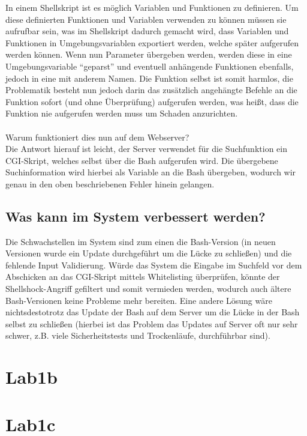 \documentclass[12pt,a4paper,titlepage,oneside]{scrartcl}
\begin{document}
In einem Shellskript ist es möglich Variablen und Funktionen zu definieren. Um diese definierten Funktionen und Variablen verwenden zu können müssen sie aufrufbar sein, was im Shellskript dadurch gemacht wird, dass Variablen und Funktionen in Umgebungsvariablen exportiert werden, welche später aufgerufen werden können. Wenn nun Parameter übergeben werden, werden diese in eine Umgebungsvariable "`geparst"' und eventuell anhängende Funktionen ebenfalls, jedoch in eine mit anderem Namen. Die Funktion selbst ist somit harmlos, die Problematik besteht nun jedoch darin das zusätzlich angehängte Befehle an die Funktion sofort (und ohne Überprüfung) aufgerufen werden, was heißt, dass die Funktion nie aufgerufen werden muss um Schaden anzurichten. \\
\\
Warum funktioniert dies nun auf dem Webserver? \\
Die Antwort hierauf ist leicht, der Server verwendet für die Suchfunktion ein CGI-Skript, welches selbst über die Bash aufgerufen wird. Die übergebene Suchinformation wird hierbei als Variable an die Bash übergeben, wodurch wir genau in den oben beschriebenen Fehler hinein gelangen.

\subsection{Was kann im System verbessert werden?}

Die Schwachstellen im System sind zum einen die Bash-Version (in neuen Versionen wurde ein Update durchgeführt um die Lücke zu schließen) und die fehlende Input Validierung. Würde das System die Eingabe im Suchfeld vor dem Abschicken an das CGI-Skript mittels Whitelisting überprüfen, könnte der Shellshock-Angriff gefiltert und somit vermieden werden, wodurch auch ältere Bash-Versionen keine Probleme mehr bereiten. Eine andere Lösung wäre nichtsdestotrotz das Update der Bash auf dem Server um die Lücke in der Bash selbst zu schließen (hierbei ist das Problem das Updates auf Server oft nur sehr schwer, z.B. viele Sicherheitstests und Trockenläufe, durchführbar sind).

\section{Lab1b}

\section{Lab1c}
\end{document}

